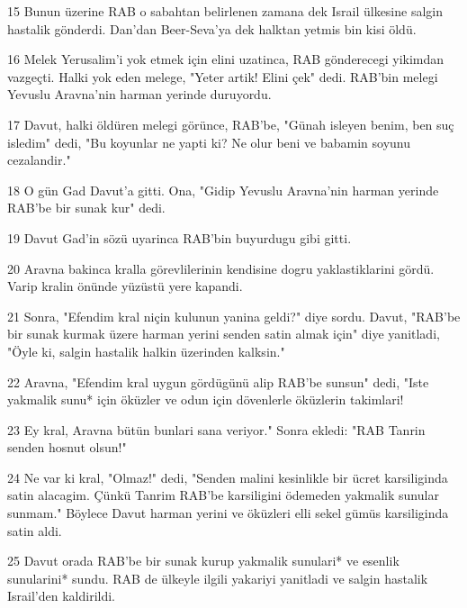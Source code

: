 \par 15 Bunun üzerine RAB o sabahtan belirlenen zamana dek Israil ülkesine salgin hastalik gönderdi. Dan'dan Beer-Seva'ya dek halktan yetmis bin kisi öldü.
\par 16 Melek Yerusalim'i yok etmek için elini uzatinca, RAB gönderecegi yikimdan vazgeçti. Halki yok eden melege, "Yeter artik! Elini çek" dedi. RAB'bin melegi Yevuslu Aravna'nin harman yerinde duruyordu.
\par 17 Davut, halki öldüren melegi görünce, RAB'be, "Günah isleyen benim, ben suç isledim" dedi, "Bu koyunlar ne yapti ki? Ne olur beni ve babamin soyunu cezalandir."
\par 18 O gün Gad Davut'a gitti. Ona, "Gidip Yevuslu Aravna'nin harman yerinde RAB'be bir sunak kur" dedi.
\par 19 Davut Gad'in sözü uyarinca RAB'bin buyurdugu gibi gitti.
\par 20 Aravna bakinca kralla görevlilerinin kendisine dogru yaklastiklarini gördü. Varip kralin önünde yüzüstü yere kapandi.
\par 21 Sonra, "Efendim kral niçin kulunun yanina geldi?" diye sordu. Davut, "RAB'be bir sunak kurmak üzere harman yerini senden satin almak için" diye yanitladi, "Öyle ki, salgin hastalik halkin üzerinden kalksin."
\par 22 Aravna, "Efendim kral uygun gördügünü alip RAB'be sunsun" dedi, "Iste yakmalik sunu* için öküzler ve odun için dövenlerle öküzlerin takimlari!
\par 23 Ey kral, Aravna bütün bunlari sana veriyor." Sonra ekledi: "RAB Tanrin senden hosnut olsun!"
\par 24 Ne var ki kral, "Olmaz!" dedi, "Senden malini kesinlikle bir ücret karsiliginda satin alacagim. Çünkü Tanrim RAB'be karsiligini ödemeden yakmalik sunular sunmam." Böylece Davut harman yerini ve öküzleri elli sekel gümüs karsiliginda satin aldi.
\par 25 Davut orada RAB'be bir sunak kurup yakmalik sunulari* ve esenlik sunularini* sundu. RAB de ülkeyle ilgili yakariyi yanitladi ve salgin hastalik Israil'den kaldirildi.


